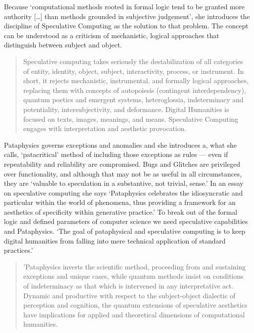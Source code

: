 Because `computational methods rooted in formal logic tend to be granted more authority […] than methods grounded in subjective judgement', she introduces the discipline of Speculative Computing as the solution to that problem.  The concept can be understood as a criticism of mechanistic, logical approaches that distinguish between subject and object.

\begin{quotation}
  Speculative computing takes seriously the destabilization of all categories of entity, identity, object, subject, interactivity, process, or instrument. In short, it rejects mechanistic, instrumental, and formally logical approaches, replacing them with concepts of autopoiesis (contingent interdependency), quantum poetics and emergent systems, heteroglossia, indeterminacy and potentiality, intersubjectivity, and deformance. Digital Humanities is focused on texts, images, meanings, and means. Speculative Computing engages with interpretation and aesthetic provocation. 
\end{quotation}

Pataphysics governs exceptions and anomalies and she introduces a, what she calls, `patacritical' method of including those exceptions as rules --- even if repeatability and reliability are compromised. Bugs and Glitches are privileged over functionality, and although that may not be as useful in all circumstances, they are `valuable to speculation in a substantive, not trivial, sense.' In an essay on speculative computing \autocite{Drucker2007} she says `Pataphysics celebrates the idiosyncratic and particular within the world of phenomena, thus providing a framework for an aesthetics of specificity within generative practice.' To break out of the formal logic and defined parameters of computer science we need speculative capabilities and Pataphysics. `The goal of pataphysical and speculative computing is to keep digital humanities from falling into mere technical application of standard practices.'

\begin{quotation}
  'Pataphysics inverts the scientific method, proceeding from and sustaining exceptions and unique cases, while quantum methods insist on conditions of indeterminacy as that which is intervened in any interpretative act. Dynamic and productive with respect to the subject-object dialectic of perception and cognition, the quantum extensions of speculative aesthetics have implications for applied and theoretical dimensions of computational humanities. %
\end{quotation}

